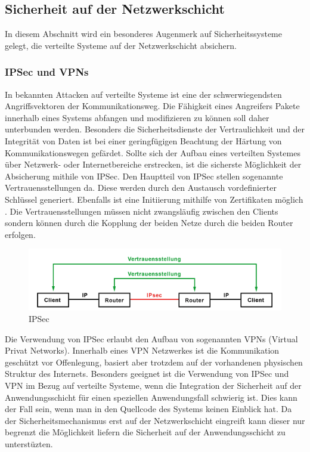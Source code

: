 \documentclass[utf8,biblatex]{lni}
\begin{document}
\subsection{Sicherheit auf der Netzwerkschicht}

In diesem Abschnitt wird ein besonderes Augenmerk auf Sicherheitssysteme gelegt, 
die verteilte Systeme auf der Netzwerkschicht absichern. 

\subsubsection{IPSec und VPNs}

In bekannten Attacken auf verteilte Systeme ist eine der schwerwiegendsten Angriffsvektoren
der Kommunikationsweg. Die Fähigkeit eines Angreifers Pakete innerhalb eines Systems abfangen und 
modifizieren zu können soll daher unterbunden werden. 
Besonders die Sicherheitsdienste der Vertraulichkeit und der Integrität von Daten ist bei 
einer geringfügigen Beachtung der Härtung von Kommunikationswegen gefärdet. 
Sollte sich der Aufbau eines verteilten Systemes über Netzwerk- oder Internetbereiche 
erstrecken, ist die sicherste Möglichkeit der Absicherung mithile von IPSec. 
Den Hauptteil von IPSec stellen sogenannte Vertrauensstellungen da. 
Diese werden durch den Austausch vordefinierter Schlüssel generiert. 
Ebenfalls ist eine Initiierung mithilfe von Zertifikaten möglich \cite{o.V.02.12.2020}.
Die Vertrauensstellungen müssen nicht zwangsläufig zwischen den Clients sondern 
können durch die Kopplung der beiden Netze durch die beiden Router erfolgen.

\begin{figure}
  \centering
  \includegraphics[width=\textwidth]{images/ipsec.png}
  \caption[IPSec]{IPSec} 
  \label{IPsec}
\end{figure}  

Die Verwendung von IPSec erlaubt den Aufbau von sogenannten VPNs (Virtual Privat Networks).
Innerhalb eines VPN Netzwerkes ist die Kommunikation geschützt vor Offenlegung, 
basiert aber trotzdem auf der vorhandenen physischen Struktur des Internets.
Besonders geeignet ist die Verwendung von IPSec und VPN im Bezug auf verteilte Systeme, 
wenn die Integration der Sicherheit auf der Anwendungsschicht für einen speziellen 
Anwendungsfall schwierig ist. Dies kann der Fall sein, wenn man in den Quellcode 
des Systems keinen Einblick hat. 
Da der Sicherheitsmechanismus erst auf der Netzwerkschicht eingreift kann dieser 
nur begrenzt die Möglichkeit liefern die Sicherheit auf der Anwendungsschicht zu unterstüzten. \citet{Rehm.29.01.2019}
\end{document}
